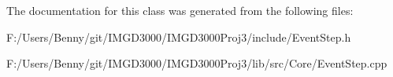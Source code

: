 The documentation for this class was generated from the following files\+:\begin{DoxyCompactItemize}
\item 
F\+:/\+Users/\+Benny/git/\+I\+M\+G\+D3000/\+I\+M\+G\+D3000\+Proj3/include/Event\+Step.\+h\item 
F\+:/\+Users/\+Benny/git/\+I\+M\+G\+D3000/\+I\+M\+G\+D3000\+Proj3/lib/src/\+Core/Event\+Step.\+cpp\end{DoxyCompactItemize}

